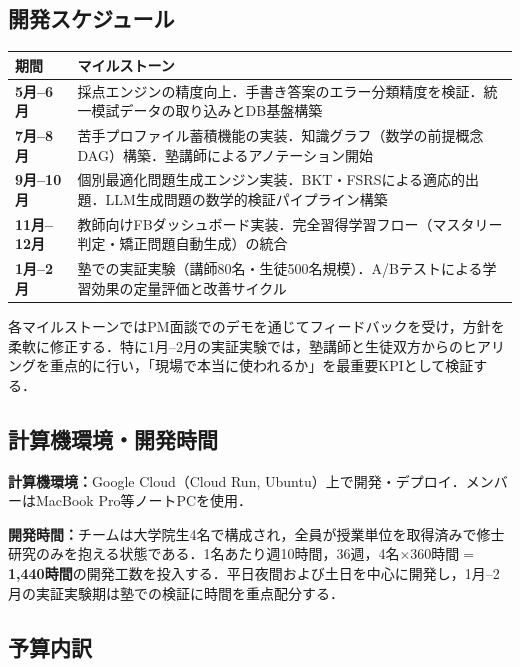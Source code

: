\documentclass[paper=a4,fontsize=10.5bp,jafontsize=10.5bp,twocolumn]{jlreq}
\begin{document}
\subsection{開発スケジュール}

\begin{scriptsize}\noindent
\begin{tabularx}{\linewidth}{>{\bfseries}l X}
\toprule
期間 & マイルストーン \\
\midrule
5月--6月 & 採点エンジンの精度向上．手書き答案のエラー分類精度を検証．統一模試データの取り込みとDB基盤構築 \\
7月--8月 & 苦手プロファイル蓄積機能の実装．知識グラフ（数学の前提概念DAG）構築．塾講師によるアノテーション開始 \\
9月--10月 & 個別最適化問題生成エンジン実装．BKT・FSRSによる適応的出題．LLM生成問題の数学的検証パイプライン構築 \\
11月--12月 & 教師向けFBダッシュボード実装．完全習得学習フロー（マスタリー判定・矯正問題自動生成）の統合 \\
1月--2月 & 塾での実証実験（講師80名・生徒500名規模）．A/Bテストによる学習効果の定量評価と改善サイクル \\
\bottomrule
\end{tabularx}
\end{scriptsize}

\noindent
各マイルストーンではPM面談でのデモを通じてフィードバックを受け，方針を柔軟に修正する．特に1月--2月の実証実験では，塾講師と生徒双方からのヒアリングを重点的に行い，「現場で本当に使われるか」を最重要KPIとして検証する．

\subsection{計算機環境・開発時間}

\noindent\textbf{計算機環境：}Google Cloud（Cloud Run, Ubuntu）上で開発・デプロイ．メンバーはMacBook Pro等ノートPCを使用．

\noindent\textbf{開発時間：}チームは大学院生4名で構成され，全員が授業単位を取得済みで修士研究のみを抱える状態である．1名あたり週10時間，36週，4名$\times$360時間$=$\textbf{1,440時間}の開発工数を投入する．平日夜間および土日を中心に開発し，1月--2月の実証実験期は塾での検証に時間を重点配分する．

\subsection{予算内訳}
\end{document}

